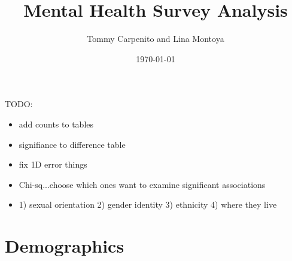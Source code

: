 \documentclass{article}\usepackage[]{graphicx}\usepackage[]{color}
\title{Mental Health Survey Analysis}
\author{Tommy Carpenito and Lina Montoya}
\date{\today}
\begin{document}
\maketitle
\tableofcontents

\pagebreak

TODO:

\begin{itemize}
\item add counts to tables
\item signifiance to difference table
\item fix 1D error things
\item Chi-sq...choose which ones want to examine significant associations
\item 1) sexual orientation 2) gender identity 3) ethnicity 4) where they live
\end{itemize}

\section{Demographics}
\end{document}
